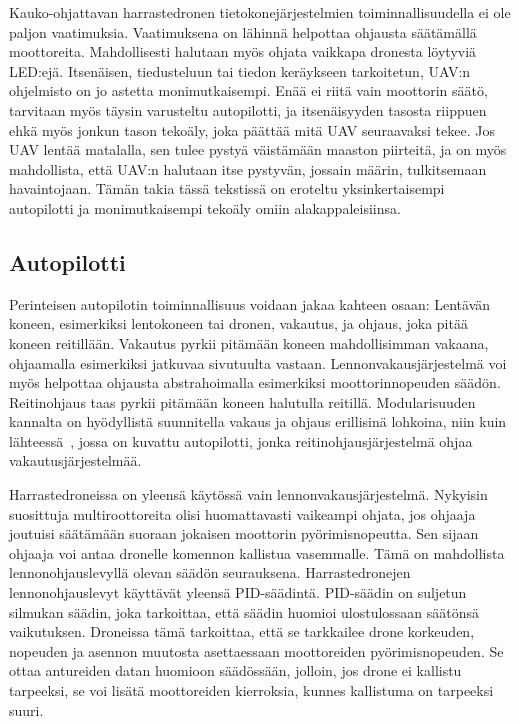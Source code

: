 Kauko-ohjattavan harrastedronen tietokonejärjestelmien toiminnallisuudella ei
ole paljon vaatimuksia. Vaatimuksena on lähinnä helpottaa ohjausta säätämällä
moottoreita.  Mahdollisesti halutaan myös ohjata vaikkapa dronesta löytyviä
LED:ejä.  Itsenäisen, tiedusteluun tai tiedon keräykseen tarkoitetun, UAV:n
ohjelmisto on jo astetta monimutkaisempi. Enää ei riitä vain moottorin säätö,
tarvitaan myös täysin varusteltu autopilotti, ja itsenäisyyden tasosta riippuen
ehkä myös jonkun tason tekoäly, joka päättää mitä UAV seuraavaksi tekee. Jos UAV
lentää matalalla, sen tulee pystyä väistämään maaston piirteitä, ja on myös
mahdollista, että UAV:n halutaan itse pystyvän, jossain määrin, tulkitsemaan
havaintojaan.
Tämän takia tässä tekstissä on eroteltu yksinkertaisempi
autopilotti ja monimutkaisempi tekoäly omiin alakappaleisiinsa.

\subsection{Autopilotti}
Perinteisen autopilotin toiminnallisuus voidaan jakaa kahteen osaan: Lentävän
koneen, esimerkiksi lentokoneen tai dronen, vakautus, ja ohjaus, joka pitää
koneen reitillään. Vakautus pyrkii pitämään koneen mahdollisimman vakaana,
ohjaamalla esimerkiksi jatkuvaa sivutuulta vastaan. Lennonvakausjärjestelmä voi
myös helpottaa ohjausta abstrahoimalla esimerkiksi moottorinnopeuden säädön.
Reitinohjaus taas pyrkii pitämään koneen halutulla reitillä. Modularisuuden
kannalta on hyödyllistä suunnitella vakaus ja ohjaus erillisinä lohkoina, niin
kuin lähteessä~\cite{Capello2017}, jossa on kuvattu autopilotti, jonka
reitinohjausjärjestelmä ohjaa vakautusjärjestelmää.

Harrastedroneissa on yleensä käytössä vain lennonvakausjärjestelmä. Nykyisin
suosittuja multiroottoreita olisi huomattavasti vaikeampi ohjata, jos ohjaaja
joutuisi säätämään suoraan jokaisen moottorin pyörimisnopeutta. Sen sijaan
ohjaaja voi antaa dronelle komennon kallistua vasemmalle. Tämä on mahdollista
lennonohjauslevyllä olevan säädön seurauksena. Harrastedronejen
lennonohjauslevyt käyttävät yleensä PID-säädintä. PID-säädin on suljetun
silmukan säädin, joka tarkoittaa, että säädin huomioi ulostulossaan säätönsä
vaikutuksen. Droneissa tämä tarkoittaa, että se tarkkailee drone korkeuden,
nopeuden ja asennon muutosta asettaessaan moottoreiden
pyörimisnopeuden. Se ottaa antureiden datan huomioon säädössään, jolloin, jos
drone ei kallistu tarpeeksi, se voi lisätä moottoreiden kierroksia, kunnes
kallistuma on tarpeeksi suuri.~\cite{Sebbane2015}

